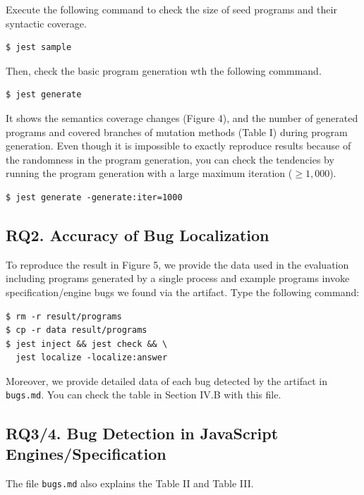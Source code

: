 \documentclass[conference]{IEEEtran}
\begin{document}
Execute the following command to check the size of seed programs and their
syntactic coverage.
\begin{lstlisting}
$ jest sample
\end{lstlisting}
Then, check the basic program generation wth the following commmand.
\begin{lstlisting}
$ jest generate
\end{lstlisting}
It shows the semantics coverage changes (Figure 4), and the number of generated
programs and covered branches of mutation methods (Table I) during program
generation.  Even though it is impossible to exactly reproduce results because
of the randomness in the program generation, you can check the tendencies by
running the program generation with a large maximum iteration ($\geq 1,000$).
\begin{lstlisting}
$ jest generate -generate:iter=1000
\end{lstlisting}

\subsection{RQ2. Accuracy of Bug Localization}

To reproduce the result in Figure 5, we provide the data used in the evaluation
including programs generated by a single process and example programs invoke
specification/engine bugs we found via the artifact.  Type the following
command:
\begin{lstlisting}
$ rm -r result/programs
$ cp -r data result/programs
$ jest inject && jest check && \
  jest localize -localize:answer
\end{lstlisting}
Moreover, we provide detailed data of each bug detected by the artifact in
\texttt{bugs.md}. You can check the table in Section IV.B with this file.

\subsection{RQ3/4. Bug Detection in JavaScript Engines/Specification}

The file \texttt{bugs.md} also explains the Table II and Table III.
\end{document}
